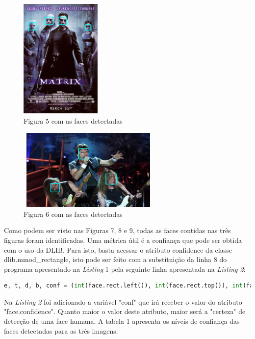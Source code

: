 \documentclass[conference]{IEEEtran}
\begin{document}
	    \begin{figure}[h!b]
			\centering \includegraphics[width=4cm,height=6cm]{matrix_detectada.png}
			\caption{Figura 5 com as faces detectadas} 
		\end{figure}

         \begin{figure}[h!b]
			\centering \includegraphics[width=7cm,height=4cm]{iron_detectada.png}
			\caption{Figura 6 com as faces detectadas} 
		\end{figure}
		
        Como podem ser visto nas Figuras 7, 8 e 9, todas as faces contidas nas três figuras foram identificadas. Uma métrica útil é a confiança que pode ser obtida com o uso da DLIB. Para isto, basta acessar o atributo confidence da classe dlib.mmod\_rectangle, isto pode ser feito com a substituição da linha 8 do programa apresentado na \textit{Listing} 1 pela seguinte linha apresentada na \textit{Listing 2}:
        
\begin{lstlisting}[breaklines=true, language=Python, caption=Código para descobrir a confiança no DLIB]
    e, t, d, b, conf = (int(face.rect.left()), int(face.rect.top()), int(face.rect.right()), int(face.rect.bottom()), face.confidence)\end{lstlisting}

        Na \textit{Listing 2} foi adicionado a variável "conf" que irá receber o valor do atributo "face.confidence". Quanto maior o valor deste atributo, maior será a "certeza" de detecção de uma face humana. A tabela 1 apresenta os níveis de confiança das faces detectadas para as três imagens:
        
\end{document}
